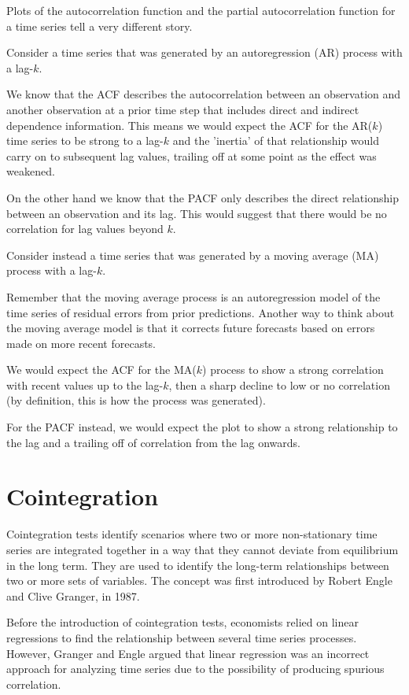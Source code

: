 Plots of the autocorrelation function and the partial autocorrelation
function for a time series tell a very different story. 

Consider a time series that was generated by an autoregression (AR)
process with a lag-\(k\).

We know that the ACF describes the autocorrelation between an
observation and another observation at a prior time step that includes
direct and indirect dependence information. This means we would expect
the ACF for the AR(\(k\)) time series to be strong to a lag-\(k\) and
the 'inertia' of that relationship would carry on to subsequent lag
values, trailing off at some point as the effect was weakened.

On the other hand we know that the PACF only describes the 
direct relationship between an observation and its lag. 
This would suggest that there would be no correlation for 
lag values beyond \(k\).

Consider instead a time series that was generated by a moving average (MA)
process with a lag-\(k\).

Remember that the moving average process is an autoregression model of
the time series of residual errors from prior predictions. Another way
to think about the moving average model is that it corrects future
forecasts based on errors made on more recent forecasts.

We would expect the ACF for the MA(\(k\)) process to show a strong
correlation with recent values up to the lag-\(k\), then a sharp decline
to low or no correlation (by definition, this is how the process was
generated).

For the PACF instead, we would expect the plot to show a strong 
relationship to the lag and a trailing off of correlation 
from the lag onwards.

\section{Cointegration}\label{cointegration}

Cointegration tests identify scenarios where two or more non-stationary
time series are integrated together in a way that they cannot deviate
from equilibrium in the long term. They are used to identify the
long-term relationships between two or more sets of variables. The
concept was first introduced by Robert Engle and Clive Granger, in 1987.

Before the introduction of cointegration tests, economists relied on
linear regressions to find the relationship between several time series
processes. However, Granger and Engle argued that linear regression
was an incorrect approach for analyzing time series due to the
possibility of producing spurious correlation.

